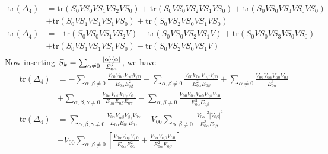 \documentclass[]{article}
\begin{document}
\begin{enumerate}[1)]
\begin{equation}
\begin{split}
\text{tr}(\Delta_4) & =  
\text{tr}(S_0VS_0VS_1VS_2VS_0)+ %
\text{tr}(S_0VS_0VS_2VS_1VS_0)+ %
\text{tr}(S_0VS_0VS_3VS_0VS_0)\\ &+  %
\text{tr}(S_0VS_1VS_1VS_1VS_0)+ %
\text{tr}(S_0VS_2VS_0VS_1VS_0) %
\\
\text{tr}(\Delta_4) & =  
- \text{tr}(S_0VS_0VS_1VS_2V)
- \text{tr}(S_0VS_0VS_2VS_1V)+ 
\text{tr}(S_0VS_0VS_3VS_0VS_0)\\ &+  
\text{tr}(S_0VS_1VS_1VS_1VS_0) -
\text{tr}(S_0VS_2VS_0VS_1V) 
\\
\end{split}
\end{equation}
Now inserting $S_k = \sum_{\alpha \ne 0} \frac{\ket{\alpha}\bra{\alpha}}{E_{0\alpha}^k}$, we have \\
\begin{equation}
\begin{split}
\text{tr}(\Delta_4) & = -\sum_{\alpha,\beta \ne 0} \frac{  V_{00}  V_{0\alpha}  V_{\alpha\beta}  V_{\beta 0}  }{  E_{0\alpha}E_{0\beta}^2  } - \sum_{\alpha,\beta \ne 0} \frac{  V_{00}  V_{0\alpha}  V_{\alpha\beta}  V_{\beta 0}  }{  E_{0\alpha}^2E_{0\beta}  }  + \sum_{\alpha \ne 0} \frac{V_{00}  V_{0\alpha}V_{\alpha0} V_{00} }{E_{0\alpha}^3}  \\ &+   \sum_{\alpha,\beta,\gamma \ne 0} \frac{  V_{0\alpha}  V_{\alpha\beta} V_{\beta\gamma} V_{0\gamma}  }{  E_{0\alpha}E_{0\beta} E_{0\gamma}   } -   \sum_{\alpha, \beta \ne 0} \frac{   V_{00} V_{0\alpha} V_{\alpha 0} V_{0\beta} V_{\beta 0}  }{ E_{0\alpha}^2 E_{ 0\beta}  } \\
\text{tr}(\Delta_4) & = \sum_{\alpha,\beta,\gamma \ne 0} \frac{  V_{0\alpha}  V_{\alpha\beta} V_{\beta\gamma} V_{0\gamma}  }{  E_{0\alpha}E_{0\beta} E_{0\gamma}   } 
-   V_{00}  \sum_{\alpha, \beta \ne 0} \frac{ |V_{0\alpha}|^2  |V_{0\beta}|^2  }{ E_{0\alpha}^2 E_{ 0\beta}  } 
\\ & -V_{00}\sum_{\alpha,\beta \ne 0}  \left[\frac{  V_{0\alpha}  V_{\alpha\beta}  V_{\beta 0}  }{  E_{0\alpha}E_{0\beta}^2  } + \frac{  V_{0\alpha}  V_{\alpha\beta}  V_{\beta 0}  }{  E_{0\alpha}^2E_{0\beta}  }  \right]     

\end{split}
\end{equation}
\end{enumerate}
\end{document}
